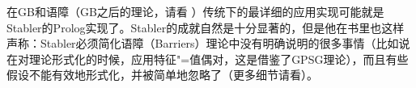 在GB和语障（GB之后的理论，请看 \citealp{Chomsky86b}）传统下的最详细的应用实现可能就是Stabler的Prolog实现了\citeyearpar{Stabler92a-u}。Stabler的成就自然是十分显著的，但是他在书里也这样声称：Stabler必须简化语障（Barriers）理论中没有明确说明的很多事情（比如说在对\xbarc 理论形式化的时候，应用特征"=值偶对，这是借鉴了GPSG理论\indexgpsgc），而且有些假设不能有效地形式化，并被简单地忽略了（更多细节请看\citealp{Briscoe97a}）。

